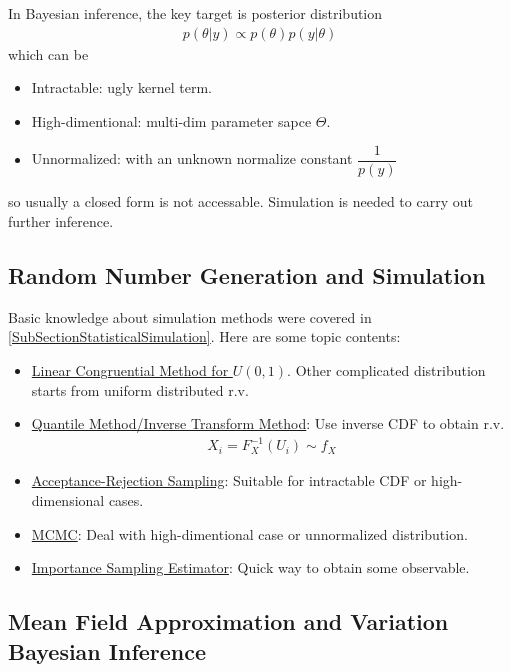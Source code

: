 In Bayesian inference, the key target is posterior distribution
\begin{align*}
    p(\theta |y)\propto p(\theta )p(y|\theta ) 
\end{align*}
which can be 
\begin{itemize}[topsep=2pt,itemsep=0pt]
    \item Intractable: ugly kernel term.
    \item High-dimentional: multi-dim parameter sapce $ \Theta $.
    \item Unnormalized: with an unknown normalize constant $ 
    \dfrac{ 1 }{ p(y) }   $
\end{itemize}

so usually a closed form is not accessable. Simulation is needed to carry out further inference.

    


\subsection{Random Number Generation and Simulation}

Basic knowledge about simulation methods were covered in \autoref{SubSectionStatisticalSimulation}. Here are some topic contents:
\begin{itemize}[topsep=2pt,itemsep=0pt]
    \item \hyperlink{StatisticalSimulationLCM}{Linear Congruential Method for $ U(0,1) $}. Other complicated distribution starts from uniform distributed r.v.
    \item \hyperlink{StatisticalSimulationInverseTrans}{Quantile Method/Inverse Transform Method}: Use inverse CDF to obtain r.v.
    \begin{align*}
        X_i=F_X^{-1}(U_i)\sim f_X 
    \end{align*}
    \item \hyperlink{StatisticalSimulationARS}{Acceptance-Rejection Sampling}: Suitable for intractable CDF or high-dimensional cases.
    \item \hyperlink{StatisticalSimulationInverseTransMCMC}{MCMC}: Deal with high-dimentional case or unnormalized distribution.
    \item \hyperlink{StatisticalSimulationInverseTransImportanceSampli}{Importance Sampling Estimator}: Quick way to obtain some observable.
\end{itemize}

    

\subsection{Mean Field Approximation and Variation Bayesian Inference}
    



